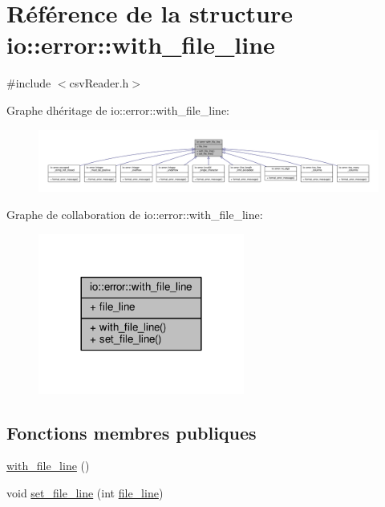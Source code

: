 \hypertarget{structio_1_1error_1_1with__file__line}{}\section{Référence de la structure io\+:\+:error\+:\+:with\+\_\+file\+\_\+line}
\label{structio_1_1error_1_1with__file__line}


{\ttfamily \#include $<$csv\+Reader.\+h$>$}



Graphe d\textquotesingle{}héritage de io\+:\+:error\+:\+:with\+\_\+file\+\_\+line\+:\nopagebreak
\begin{figure}[H]
\begin{center}
\leavevmode
\includegraphics[width=350pt]{structio_1_1error_1_1with__file__line__inherit__graph}
\end{center}
\end{figure}


Graphe de collaboration de io\+:\+:error\+:\+:with\+\_\+file\+\_\+line\+:\nopagebreak
\begin{figure}[H]
\begin{center}
\leavevmode
\includegraphics[width=192pt]{structio_1_1error_1_1with__file__line__coll__graph}
\end{center}
\end{figure}
\subsection*{Fonctions membres publiques}
\begin{DoxyCompactItemize}
\item 
\hyperlink{structio_1_1error_1_1with__file__line_a742ad5e6a169a7972c908f606a28ab4e}{with\+\_\+file\+\_\+line} ()
\item 
void \hyperlink{structio_1_1error_1_1with__file__line_aa92778a81778abc676ec6ee9952bba8c}{set\+\_\+file\+\_\+line} (int \hyperlink{structio_1_1error_1_1with__file__line_a391298c37172bcdb83aeb3daf65d5a0e}{file\+\_\+line})
\end{DoxyCompactItemize}
